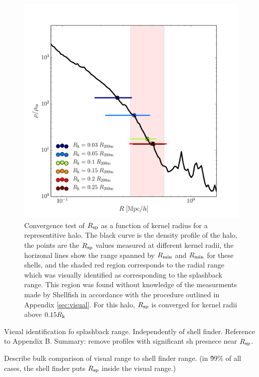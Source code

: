\documentclass[numberedappendix,apj]{emulateapj}
\begin{document}
\begin{figure}
   \centering
   \includegraphics[width=\columnwidth]{rk_convergence_prof.pdf}
   \caption{Convergence test of $R_{\rm sp}$ as a function of kernel radius for
      a representitive halo. The black curve is the density profile of the halo,
      the points are the $R_{\rm sp}$ values measured at different kernel radii,
      the horizonal lines show the range spanned by $R_{\rm min}$ and
      $R_{\rm min}$ for these shells, and the shaded red region corresponds to
      the radial range which was visually identified as corresponding to the
      splashback range. This region was found without knowledge of the
      measurments made by Shellfish in accordance with the procedure outlined
      in Appendix \ref{sec:visual}. For this halo, $R_{\rm sp}$ is converged
      for kernel radii above $0.15R_{\rm k}$
   }
    \label{fig:rk_convergence_prof}
\end{figure}

Visual identification fo splashback range. Independently of shell finder.
Reference to Appendix B. Summary: remove profiles with significant sh presnece
near $R_{\rm sp}$.

Describe bulk comparison of visual range to shell finder range.
(in \~ 99\% of all cases, the shell finder puts $R_{\rm sp}$ inside the visual
range.)
\end{document}
